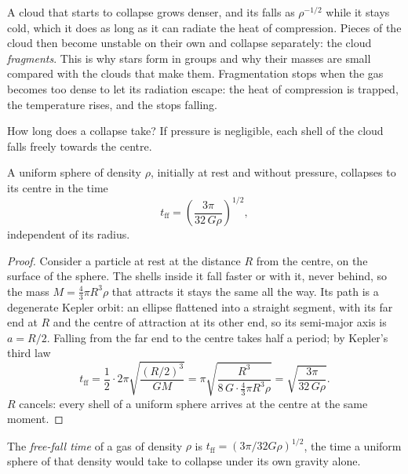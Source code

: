 A cloud that starts to collapse grows denser, and its  falls as
$\rho^{-1/2}$ while it stays cold, which it does as long as it can radiate the
heat of compression. Pieces of the cloud then become unstable on their own
and collapse separately: the cloud \emph{fragments}. This is why stars form
in groups and why their masses are small compared with the clouds that make
them. Fragmentation stops when the gas becomes too dense to let its radiation
escape: the heat of compression is trapped, the temperature rises, and the
 stops falling.

How long does a collapse take? If pressure is negligible, each shell of the
cloud falls freely towards the centre.

\begin{proposition}\label{prop:b2:ism-star-formation:free-fall}
A uniform sphere of density $\rho$, initially at rest and without pressure,
collapses to its centre in the time
\[
  t_{\mathrm{ff}} = \left(\frac{3\pi}{32\,G\rho}\right)^{1/2},
\]
independent of its radius.
\end{proposition}

\begin{proof}
Consider a particle at rest at the distance $R$ from the centre, on the
surface of the sphere. The shells inside it fall faster or with it, never
behind, so the mass $M = \tfrac43\pi R^3\rho$ that attracts it stays the same
all the way. Its path is a degenerate Kepler orbit: an ellipse flattened into
a straight segment, with its far end at $R$ and the centre of attraction at
its other end, so its semi-major axis is $a = R/2$. Falling from the far end
to the centre takes half a period; by Kepler's third law
\[
  t_{\mathrm{ff}} = \frac12\cdot 2\pi\sqrt{\frac{(R/2)^3}{GM}}
  = \pi\sqrt{\frac{R^3}{8\,G\cdot\frac43\pi R^3\rho}}
  = \sqrt{\frac{3\pi}{32\,G\rho}} .
\]
$R$ cancels: every shell of a uniform sphere arrives at the centre at the same
moment.
\end{proof}

\begin{definition}\label{def:b2:ism-star-formation:free-fall}
The \emph{free-fall time} of a gas of density $\rho$ is
$t_{\mathrm{ff}} = (3\pi/32G\rho)^{1/2}$, the time a uniform sphere of that
density would take to collapse under its own gravity alone.
\end{definition}

